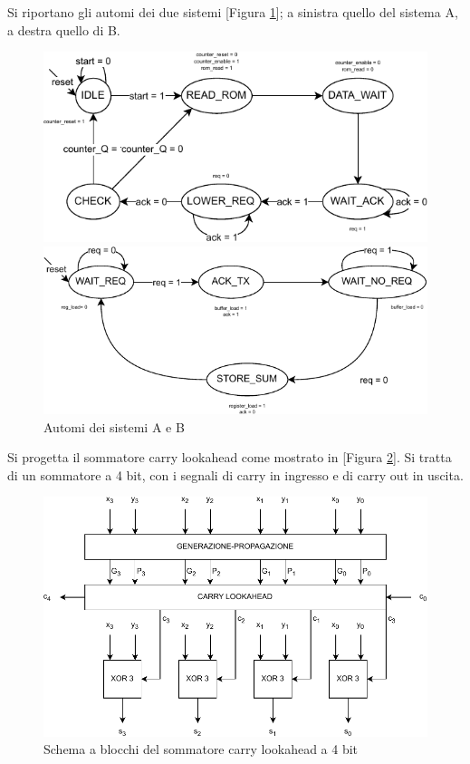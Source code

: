 Si riportano gli automi dei due sistemi [Figura \ref{fig:december_exam}]; a sinistra quello del sistema A, a destra quello di B.

\begin{figure}[h]
    \centering
    \begin{minipage}[c]{0.45\linewidth}
        \includegraphics[width=\linewidth]{img/december_exam_A.pdf}
    \end{minipage}
    \hfill
    \begin{minipage}[c]{0.45\linewidth}
        \includegraphics[width=\linewidth]{img/december_exam_B.pdf}
    \end{minipage}
    \caption{Automi dei sistemi A e B}
    \label{fig:december_exam}
\end{figure}

Si progetta il sommatore carry lookahead come mostrato in [Figura \ref{fig:carry_lookahead_adder_4}]. Si tratta di un sommatore a 4 bit, con i segnali di carry in ingresso e di carry out in uscita.

\begin{figure}[h]
    \centering
    \includegraphics[width=0.5\linewidth]{img/carry_lookahead_adder_4.pdf}
    \caption{Schema a blocchi del sommatore carry lookahead a 4 bit}
    \label{fig:carry_lookahead_adder_4}
\end{figure}

